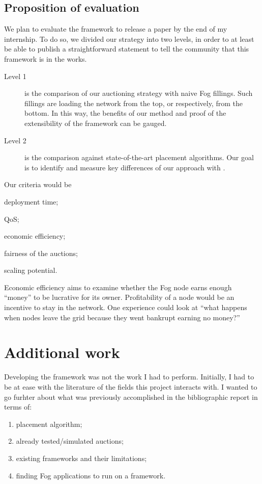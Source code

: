 \subsection{Proposition of evaluation}
\label{sec:evaluating}

We plan to evaluate the framework to release a paper by the end of my internship. To do so, we divided our strategy into two levels, in order to at least be able to publish a straightforward statement to tell the community that this framework is in the works.

\begin{description}
	\item[Level 1]{is the comparison of our auctioning strategy with naive Fog fillings. Such fillings are loading the network from the top, or respectively, from the bottom. In this way, the benefits of our method and proof of the extensibility of the framework can be gauged.}
	\item[Level 2]{is the comparison against state-of-the-art placement algorithms. Our goal is to identify and measure key differences of our approach with \cite{tasiopoulos_fogspot_2019, bermbach_auctionwhisk_2021}.}
\end{description}

Our criteria would be
\begin{enumerate*}[(1)]
	\item deployment time;
	\item \gls{QoS};
	\item economic efficiency;
	\item fairness of the auctions;
	\item scaling potential.
\end{enumerate*}

Economic efficiency aims to examine whether the Fog node earns enough “money” to be lucrative for its owner. Profitability of a node would be an incentive to stay in the network. One experience could look at “what happens when nodes leave the grid because they went bankrupt earning no money?”

\section{Additional work}
\label{sec:additionalwork}

Developing the framework was not the work I had to perform. Initially, I had to be at ease with the literature of the fields this project interacts with. I wanted to go furhter about what was previously accomplished in the bibliographic report in terms of:
\begin{enumerate}
	\item placement algorithm;\label{enumerate:placement}
	\item already tested/simulated auctions;\label{enumerate:alreadytested}
	\item existing frameworks and their limitations;\label{enumerate:frameworklimitations}
	\item finding Fog applications to run on a framework.\label{enumerate:fogapplications}
\end{enumerate}


